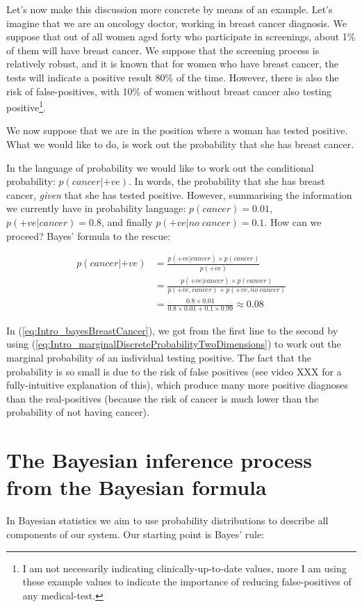 \documentclass[11pt,fullpage]{book}
\begin{document}
Let's now make this discussion more concrete by means of an example. Let's imagine that we are an oncology doctor, working in breast cancer diagnosis. We suppose that out of all women aged forty who participate in screenings, about 1\% of them will have breast cancer. We suppose that the screening process is relatively robust, and it is known that for women who have breast cancer, the tests will indicate a positive result 80\% of the time. However, there is also the risk of false-positives, with 10\% of women without breast cancer also testing positive\footnote{I am not necessarily indicating clinically-up-to-date values, more I am using these example values to indicate the importance of reducing false-positives of any medical-test.}.

We now suppose that we are in the position where a woman has tested positive. What we would like to do, is work out the probability that she has breast cancer.

In the language of probability we would like to work out the conditional probability: $p(cancer|+ve)$. In words, the probability that she has breast cancer, \textit{given} that she has tested positive. However, summarising the information we currently have in probability language: $p(cancer)=0.01$, $p(+ve|cancer)=0.8$, and finally $p(+ve|no\; cancer) = 0.1$. How can we proceed? Bayes' formula to the rescue:

\begin{equation}\label{eq:Intro_bayesBreastCancer}
\begin{align}
p(cancer|+ve) &= \frac{p(+ve|cancer)\times p(cancer)}{p(+ve)}\\
&= \frac{p(+ve|cancer)\times p(cancer)}{p(+ve,cancer)+p(+ve,no\;cancer)}\\
&= \frac{0.8\times 0.01}{0.8\times 0.01 + 0.1\times 0.99} \approx 0.08
\end{align}
\end{equation}

In (\ref{eq:Intro_bayesBreastCancer}), we got from the first line to the second by using (\ref{eq:Intro_marginalDiscreteProbabilityTwoDimensions}) to work out the marginal probability of an individual testing positive. The fact that the probability is so small is due to the risk of false positives (see video XXX for a fully-intuitive explanation of this), which produce many more positive diagnoses than the real-positives (because the risk of cancer is much lower than the probability of not having cancer).

\section{The Bayesian inference process from the Bayesian formula}
In Bayesian statistics we aim to use probability distributions to describe all components of our system. Our starting point is Bayes' rule:
\end{document}
